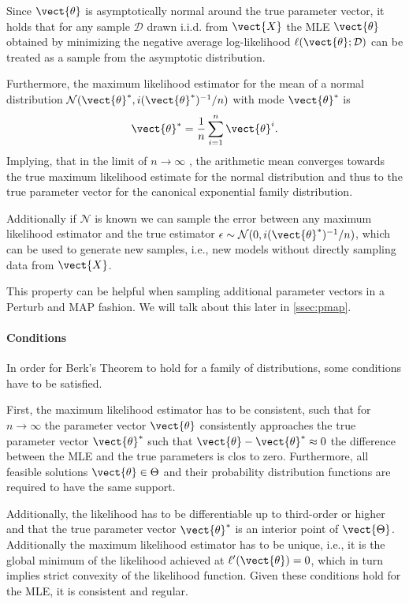         Since $\vect{\theta}$ is asymptotically normal around the true parameter vector, it holds that for any sample $\mathcal{D}$ drawn i.i.d. from $\vect{X}$ the MLE $\vect{\theta}$ obtained by minimizing the negative average log-likelihood $\ell(\vect{\theta}; \mathcal{D})$ can be treated as a sample from the asymptotic distribution.

        Furthermore, the maximum likelihood estimator for the mean of a normal distribution $\mathcal{N}(\vect{\theta}^*, i(\vect{\theta}^*)^{-1}/n)$ with mode $\vect{\theta}^*$ is
        \begin{equation}
            \vect{\theta}^* = \frac{1}{n} \sum_{i=1}^n \vect{\theta}^{i}.
        \end{equation}
        Implying, that in the limit of $n \rightarrow \infty$ , the arithmetic mean converges towards the true maximum likelihood estimate for the normal distribution and thus to the true parameter vector for the canonical exponential family distribution.
        
        Additionally if $\mathcal{N}$ is known we can sample the error between any maximum likelihood estimator and the true estimator $\epsilon \sim \mathcal{N}(0, i(\vect{\theta}^*)^{-1}/n)$, which can be used to generate new samples, i.e., new models without directly sampling data from $\vect{X}$.

        This property can be helpful when sampling additional parameter vectors in a Perturb and MAP fashion. We will talk about this later in \sect \ref{ssec:pmap}.
        
        \paragraph*{Conditions}
        In order for Berk's Theorem to hold for a family of distributions, some conditions have to be satisfied.

        First, the maximum likelihood estimator has to be consistent, such that for $n\rightarrow \infty$ the parameter vector $\vect{\theta}$ consistently approaches the true parameter vector $\vect{\theta}^*$ such that $\vect{\theta} - \vect{\theta}^* \approx 0$ the difference between the MLE and the true parameters is clos to zero.
        Furthermore, all feasible solutions $\vect{\theta}  \in \Theta$ and their probability distribution functions are required to have the same support.
        
        Additionally, the likelihood has to be differentiable up to third-order or higher and that the true parameter vector $\vect{\theta}^*$ is an interior point of $\vect{\Theta}$.
        Additionally the maximum likelihood estimator has to be unique, i.e., it is the global minimum of the likelihood achieved at $\ell'(\vect{\theta}) = 0$, which in turn implies strict convexity of the likelihood function.
        Given these conditions hold for the MLE, it is consistent and regular.

